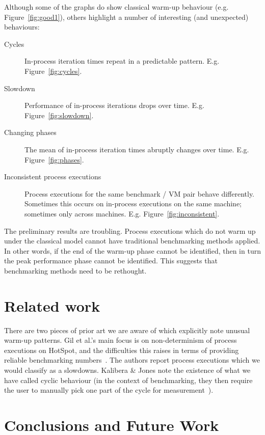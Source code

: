 \documentclass[preprint]{sigplanconf}
\newcommand{\kalibera}{Kalibera \& Jones\xspace}
\begin{document}
Although some of the graphs do show classical warm-up behaviour (e.g.
Figure~\ref{fig:good1}), others highlight a number of interesting (and
unexpected) behaviours:

\begin{description}
\item[Cycles] In-process iteration times repeat in a predictable pattern. E.g.
Figure~\ref{fig:cycles}.
\item[Slowdown] Performance of in-process iterations drops over time. E.g.
Figure~\ref{fig:slowdown}.
\item[Changing phases] The mean of in-process iteration times abruptly changes
over time. E.g. Figure~\ref{fig:phases}.
\item[Inconsistent process executions] Process executions for the same
benchmark / VM pair behave differently. Sometimes this occurs on in-process
executions on the same machine; sometimes only across machines. E.g.
Figure~\ref{fig:inconsistent}.
\end{description}

The preliminary results are troubling. Process executions which do not warm up
under the classical model cannot have traditional benchmarking methods
applied. In other words, if the end of the warm-up phase cannot be identified,
then in turn the peak performance phase cannot be identified. This suggests
that benchmarking methods need to be rethought.


\section{Related work}

There are two pieces of prior art we are aware of which explicitly note unusual warm-up
patterns. Gil et al.'s main focus is on non-determinism of process executions on
HotSpot, and the difficulties this raises in terms of providing reliable
benchmarking numbers~\cite{gil11microbenchmark}. The authors report
process executions which we would classify as a slowdowns. \kalibera note the
existence of what we have called cyclic behaviour (in the context of benchmarking,
they then require the user to
manually pick one part of the cycle for measurement~\cite{kalibera13rigorous}).

\section{Conclusions and Future Work}
\label{sec:conclusion}
\end{document}
